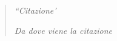
	\chapter*{}
		\begin{quote}
			
			\emph{``Citazione'\\}
		
			\hfill\textit{Da dove viene la citazione}						
			
		\end{quote}
